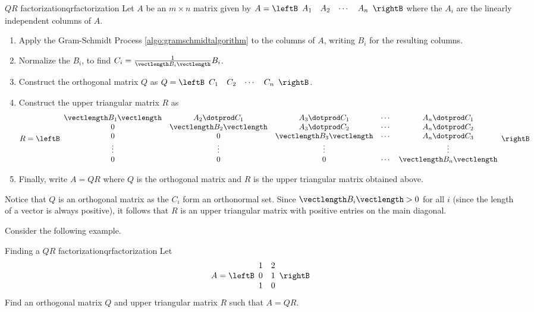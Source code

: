 \begin{procedure}{$QR$ factorization}{qrfactorization}
Let $A$ be an $m \times n$ matrix given by $A = \leftB 
\begin{array}{cccc}
A_1 & A_2 & \cdots & A_n 
\end{array}
\rightB$ where the $A_i$ are the linearly independent columns of $A$. 
\begin{enumerate}
\item
Apply the Gram-Schmidt Process \ref{algo:gramschmidtalgorithm} to the columns of $A$, writing $B_i$ for the resulting columns.

\item
Normalize the $B_i$, to find $C_i = \frac{1}{\vectlength B_i \vectlength} B_i$. 

\item
Construct the orthogonal matrix $Q$ as $Q=\leftB 
\begin{array}{cccc}
C_1 & C_2 & \cdots & C_n 
\end{array}
\rightB$. 

\item 
Construct the upper triangular matrix $R$ as 
\[ R = 
\leftB
\begin{array}{ccccc}
\vectlength B_1 \vectlength & A_2 \dotprod C_1 & A_3 \dotprod C_1 & \cdots & A_n \dotprod C_1 \\
0 & \vectlength B_2 \vectlength & A_3 \dotprod C_2 & \cdots & A_n \dotprod C_2 \\
0 & 0 & \vectlength B_3 \vectlength & \cdots & A_n \dotprod C_3 \\
\vdots & \vdots & \vdots & & \vdots \\
0 & 0 & 0 & \cdots & \vectlength B_n \vectlength 
\end{array}
\rightB
\]

\item
Finally, write $A=QR$ where $Q$ is the orthogonal matrix and $R$ is the upper triangular matrix obtained above. 
\end{enumerate} 
\end{procedure}

Notice that $Q$ is an orthogonal matrix as the $C_i$ form an orthonormal set. Since $\vectlength B_i \vectlength > 0$ for all $i$ (since the length of a vector is always positive), it follows that $R$ is an upper triangular matrix with positive entries on the main diagonal. 

Consider the following example.

\begin{example}{Finding a $QR$ factorization}{qrfactorization}
Let \[
A = \leftB \begin{array}{rr}
1 & 2 \\
0 & 1 \\
1 & 0 
\end{array} \rightB
\]
Find an orthogonal matrix $Q$ and upper triangular matrix $R$ such that $A=QR$. 
\end{example}

